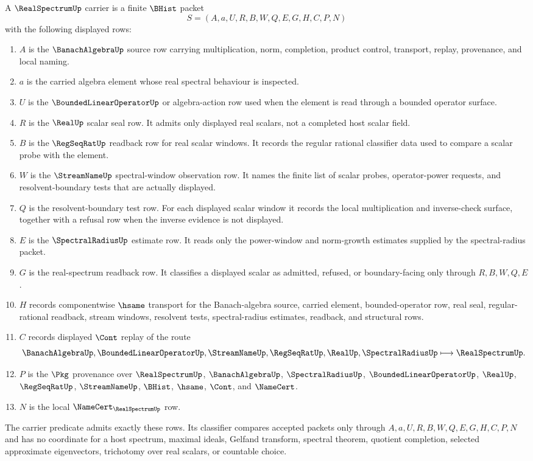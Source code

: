 \begin{definition}
\label{def:real-spectrum-carrier}
A $\RealSpectrumUp$ carrier is a finite $\BHist$ packet
$$
S=(A,a,U,R,B,W,Q,E,G,H,C,P,N)
$$
with the following displayed rows:
\begin{enumerate}
\item $A$ is the $\BanachAlgebraUp$ source row carrying multiplication, norm, completion, product control, transport, replay, provenance, and local naming.
\item $a$ is the carried algebra element whose real spectral behaviour is inspected.
\item $U$ is the $\BoundedLinearOperatorUp$ or algebra-action row used when the element is read through a bounded operator surface.
\item $R$ is the $\RealUp$ scalar seal row. It admits only displayed real scalars, not a completed host scalar field.
\item $B$ is the $\RegSeqRatUp$ readback row for real scalar windows. It records the regular rational classifier data used to compare a scalar probe with the element.
\item $W$ is the $\StreamNameUp$ spectral-window observation row. It names the finite list of scalar probes, operator-power requests, and resolvent-boundary tests that are actually displayed.
\item $Q$ is the resolvent-boundary test row. For each displayed scalar window it records the local multiplication and inverse-check surface, together with a refusal row when the inverse evidence is not displayed.
\item $E$ is the $\SpectralRadiusUp$ estimate row. It reads only the power-window and norm-growth estimates supplied by the spectral-radius packet.
\item $G$ is the real-spectrum readback row. It classifies a displayed scalar as admitted, refused, or boundary-facing only through $R,B,W,Q,E$.
\item $H$ records componentwise $\hsame$ transport for the Banach-algebra source, carried element, bounded-operator row, real seal, regular-rational readback, stream windows, resolvent tests, spectral-radius estimates, readback, and structural rows.
\item $C$ records displayed $\Cont$ replay of the route
$$
\BanachAlgebraUp,\BoundedLinearOperatorUp,\StreamNameUp,\RegSeqRatUp,\RealUp,\SpectralRadiusUp
\longmapsto \RealSpectrumUp .
$$
\item $P$ is the $\Pkg$ provenance over $\RealSpectrumUp$, $\BanachAlgebraUp$, $\SpectralRadiusUp$, $\BoundedLinearOperatorUp$, $\RealUp$, $\RegSeqRatUp$, $\StreamNameUp$, $\BHist$, $\hsame$, $\Cont$, and $\NameCert$.
\item $N$ is the local $\NameCert_{\RealSpectrumUp}$ row.
\end{enumerate}
The carrier predicate admits exactly these rows. Its classifier compares accepted packets only through $A,a,U,R,B,W,Q,E,G,H,C,P,N$ and has no coordinate for a host spectrum, maximal ideals, Gelfand transform, spectral theorem, quotient completion, selected approximate eigenvectors, trichotomy over real scalars, or countable choice.
\end{definition}

